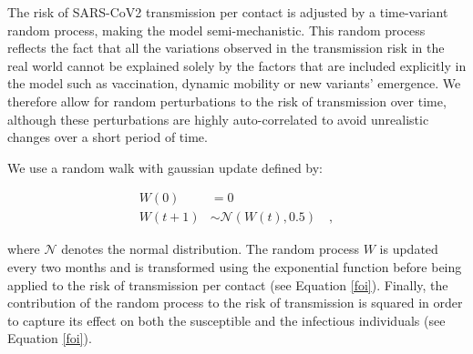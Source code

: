 The risk of SARS-CoV2 transmission per contact is adjusted by a time-variant random process, making
the model semi-mechanistic. This random process reflects the fact that all the variations observed in the transmission
risk in the real world cannot be explained solely by the factors that are included explicitly in the model such as vaccination, dynamic mobility or new variants' emergence.
We therefore allow for random perturbations to the risk of transmission over time, although these perturbations are highly auto-correlated
to avoid unrealistic changes over a short period of time.

We use a random walk with gaussian update defined by:

\begin{equation}
    \label{eq:random_process}
    \begin{split}
    W(0) & = 0 \\
    W(t+1) & \sim \mathcal{N}(W(t), 0.5) \quad ,
    \end{split}
\end{equation}

where $\mathcal{N}$ denotes the normal distribution.
The random process $W$ is updated every two months and is transformed using the exponential function before being applied to the risk of transmission per contact (see Equation \ref{foi}).
Finally, the contribution of the random process to the risk of transmission is squared in order to capture its effect
on both the susceptible and the infectious individuals (see Equation \ref{foi}). 